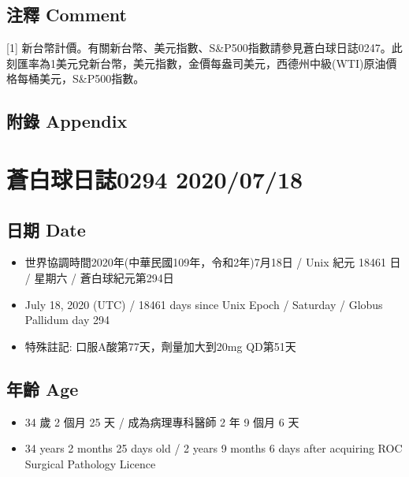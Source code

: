 \documentclass[
]{article}
\providecommand{\tightlist}{%
  \setlength{\itemsep}{0pt}\setlength{\parskip}{0pt}}
\begin{document}
\hypertarget{ux6ce8ux91cb-comment-15}{%
\subsection{注釋 Comment}\label{ux6ce8ux91cb-comment-15}}

{[}1{]}
新台幣計價。有關新台幣、美元指數、S\&P500指數請參見蒼白球日誌0247。此刻匯率為1美元兌新台幣，美元指數，金價每盎司美元，西德州中級(WTI)原油價格每桶美元，S\&P500指數。

\hypertarget{ux9644ux9304-appendix-15}{%
\subsection{附錄 Appendix}\label{ux9644ux9304-appendix-15}}

\hypertarget{ux84bcux767dux7403ux65e5ux8a8c0294-20200718}{%
\section{蒼白球日誌0294
2020/07/18}\label{ux84bcux767dux7403ux65e5ux8a8c0294-20200718}}

\hypertarget{ux65e5ux671f-date-16}{%
\subsection{日期 Date}\label{ux65e5ux671f-date-16}}

\begin{itemize}
\tightlist
\item
  世界協調時間2020年(中華民國109年，令和2年)7月18日 / Unix 紀元 18461 日
  / 星期六 / 蒼白球紀元第294日
\item
  July 18, 2020 (UTC) / 18461 days since Unix Epoch / Saturday / Globus
  Pallidum day 294
\item
  特殊註記: 口服A酸第77天，劑量加大到20mg QD第51天
\end{itemize}

\hypertarget{ux5e74ux9f61-age-16}{%
\subsection{年齡 Age}\label{ux5e74ux9f61-age-16}}

\begin{itemize}
\tightlist
\item
  34 歲 2 個月 25 天 / 成為病理專科醫師 2 年 9 個月 6 天
\item
  34 years 2 months 25 days old / 2 years 9 months 6 days after
  acquiring ROC Surgical Pathology Licence
\end{itemize}
\end{document}
